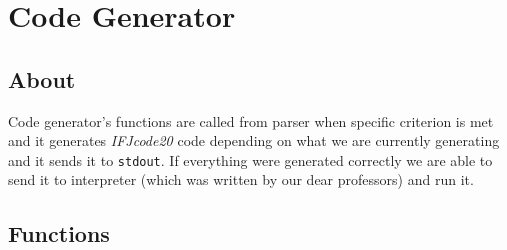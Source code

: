 \documentclass[11pt, titlepage]{article}
\begin{document}
\section{Code Generator}\label{code-generator}

\subsection{About}\label{about-3}

Code generator's functions are called from parser when
specific criterion is met and it generates \emph{IFJcode20} code
depending on what we are currently generating and it sends it to
\texttt{stdout}. If everything were generated correctly we are able to
send it to interpreter (which was written by our dear professors) and
run it.

\subsection{Functions}\label{functions-1}
\end{document}
